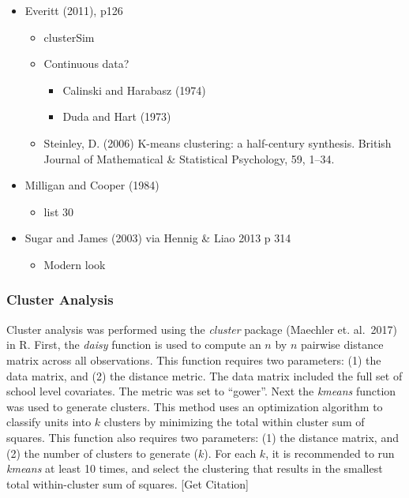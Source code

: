 \documentclass[man]{apa6}
\providecommand{\tightlist}{%
  \setlength{\itemsep}{0pt}\setlength{\parskip}{0pt}}
\begin{document}
\begin{itemize}
\tightlist
\item
  Everitt (2011), p126

  \begin{itemize}
  \tightlist
  \item
    clusterSim
  \item
    Continuous data?

    \begin{itemize}
    \tightlist
    \item
      Calinski and Harabasz (1974)
    \item
      Duda and Hart (1973)
    \end{itemize}
  \item
    Steinley, D. (2006) K-means clustering: a half-century synthesis. British Journal of Mathematical
    \& Statistical Psychology, 59, 1--34.
  \end{itemize}
\item
  Milligan and Cooper (1984)

  \begin{itemize}
  \tightlist
  \item
    list 30
  \end{itemize}
\item
  Sugar and James (2003) via Hennig \& Liao 2013 p 314

  \begin{itemize}
  \tightlist
  \item
    Modern look
  \end{itemize}
\end{itemize}

\hypertarget{cluster-analysis-1}{%
\subsubsection{Cluster Analysis}\label{cluster-analysis-1}}

Cluster analysis was performed using the \emph{cluster} package (Maechler et. al.~2017) in R. First, the \emph{daisy} function is used to compute an \(n\) by \(n\) pairwise distance matrix across all observations. This function requires two parameters: (1) the data matrix, and (2) the distance metric. The data matrix included the full set of school level covariates. The metric was set to \enquote{gower}. Next the \emph{kmeans} function was used to generate clusters. This method uses an optimization algorithm to classify units into \(k\) clusters by minimizing the total within cluster sum of squares. This function also requires two parameters: (1) the distance matrix, and (2) the number of clusters to generate (\(k\)). For each \(k\), it is recommended to run \emph{kmeans} at least 10 times, and select the clustering that results in the smallest total within-cluster sum of squares. {[}Get Citation{]}
\end{document}
